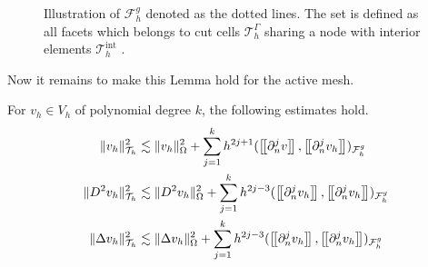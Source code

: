 \begin{figure}

\caption{Illustration of $\mathcal{F} _{h}^{g}$ denoted as the dotted lines. The set is defined as all facets which belongs to cut cells $\mathcal{T} ^{\Gamma }_{h}$ sharing a node with interior elements $\mathcal{T} ^{\mathrm{int}  }_{h}$ .  }
\label{fig:illustration_F_g}
\end{figure}


Now it remains to make this Lemma hold for the active mesh.


\begin{lemma}
    \label{lemma:bi_inv_gh_lemma}
    For $v_{h} \in  V_{h}$ of polynomial degree $k$, the following estimates hold.
        \begin{subequations}
            \begin{align}
                \label{eq:bi_inv_gh_1}
                \| v_h \|_{ \mathcal{T} _{h} }^{ 2 }  & \lesssim  \| v_h \|_{ \Omega  }^{ 2 }  + \sum_{j=1}^{k} h^{2j+1} ( \jump{ \partial ^{j}_{n} v }, \jump{ \partial ^{j}_{n} v_h}    )_{\mathcal{F}_{h}^{g}}\\
                \label{eq:bi_inv_gh_2}
                \| D ^2 v_h \|_{ \mathcal{T} _{h} }^{ 2 }  & \lesssim  \| D^2 v_h \|_{ \Omega  }^{ 2 }  + \sum_{j=1}^{k} h^{2j-3} ( \jump{ \partial ^{j}_{n} v_h }, \jump{ \partial ^{j}_{n}v_h }    )_{\mathcal{F}_{h}^{g}} \\
                \label{eq:bi_inv_gh_3}
                \| \Delta v_h \|_{ \mathcal{T} _{h} }^{ 2 }  & \lesssim  \| \Delta v_h \|_{ \Omega  }^{ 2 }  + \sum_{j=1}^{k} h^{2j-3} ( \jump{ \partial ^{j}_{n} v_h }, \jump{ \partial ^{j}_{n}v_h }    )_{\mathcal{F}_{h}^{g}}
            \end{align}
        \end{subequations}
\end{lemma}

